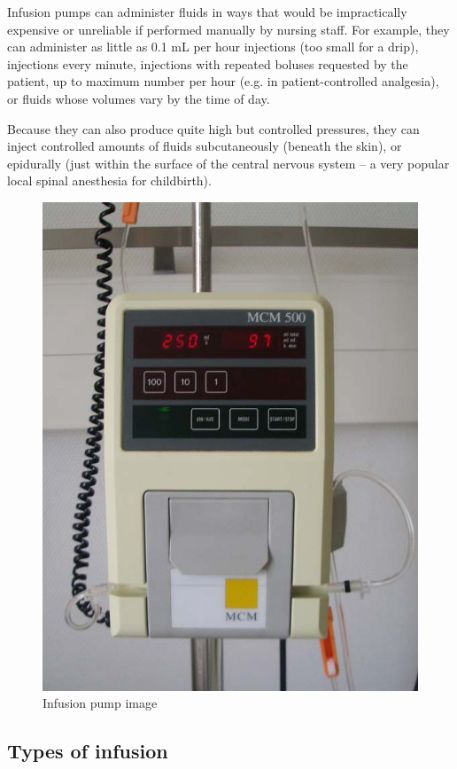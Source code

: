 \documentclass[12pt]{article}
\begin{document}
Infusion pumps can administer fluids in ways that would be impractically expensive or unreliable if performed manually by nursing staff. For example, they can administer as little as 0.1 mL per hour injections (too small for a drip), injections every minute, injections with repeated boluses requested by the patient, up to maximum number per hour (e.g. in patient-controlled analgesia), or fluids whose volumes vary by the time of day.

Because they can also produce quite high but controlled pressures, they can inject controlled amounts of fluids subcutaneously (beneath the skin), or epidurally (just within the surface of the central nervous system – a very popular local spinal anesthesia for childbirth).


\begin{figure}[h]
\centering
\includegraphics[scale=0.3]{infu.jpg}
\caption{Infusion pump image}
\end{figure}

\subsection{Types of infusion}
\end{document}
